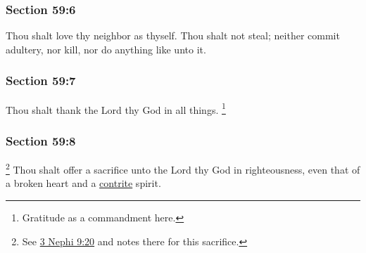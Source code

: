 	\subsubsection{Section 59:6} %
		\label{DC59-6}

		Thou shalt love thy neighbor as thyself.  Thou shalt not steal; neither commit adultery, nor kill, nor do anything like unto it.


	\subsubsection{Section 59:7} %
		\label{DC59-7}

		Thou shalt thank the Lord thy God in all things.%
		\footnote{%
			Gratitude as a commandment here.
			} 


	\subsubsection{Section 59:8} %
		\label{DC59-8}

		\footnote{%
			See \hyperref[3NEPHI-9-20]{3 Nephi 9:20} and notes there for this sacrifice.
			}%
		Thou shalt offer a sacrifice unto the Lord thy God in righteousness, even that of a broken heart and a \hyperref[CONTRITE]{contrite} spirit.


